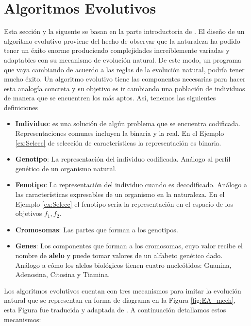 \section{Algoritmos Evolutivos} \label{sec:AE}

Esta sección y la siguente se basan en la parte introductoria de \cite{EAforMOEAs}. El diseño de un algoritmo evolutivo proviene del hecho de observar  que la naturaleza ha podido tener un éxito enorme produciendo complejidades increíblemente variadas y adaptables con su mecanismo de evolución natural. De este modo, un programa que vaya cambiando de acuerdo a las reglas de la evolución natural, podría tener mucho éxito. Un algoritmo evolutivo tiene las componentes necesarias para hacer esta analogía concreta y su objetivo es ir cambiando una población de individuos de manera que se encuentren los más aptos. Así, tenemos las siguientes definiciones

\begin{itemize}
    \item \textbf{Individuo}: es una solución de algún problema que se encuentra codificada. Representaciones comunes incluyen la binaria y la real. En el Ejemplo \ref{ex:Selecc} de selección de características  la representación es binaria.
    \item \textbf{Genotipo}: La representación del individuo codificada. Análogo al perfil genético de un organismo natural. 
    \item \textbf{Fenotipo}: La representación del individuo cuando es decodificado. Análogo a las características expresables de un organismo en la naturaleza. En el Ejemplo \ref{ex:Selecc} el fenotipo sería la representación en el espacio de los objetivos $f_1, f_2$.
    \item \textbf{Cromosomas}: Las partes que forman a los genotipos.
    \item \textbf{Genes}: Los componentes que forman a los cromosomas, cuyo valor recibe el nombre de \textbf{alelo} y puede tomar valores de un alfabeto genético dado. Análogo a cómo los alelos biológicos tienen cuatro nucleótidos: Guanina, Adenosina, Citosina y Tiamina. 
\end{itemize}

Los algoritmos evolutivos cuentan con tres mecanismos para imitar la evolución natural que se representan en forma de diagrama en la Figura \ref{fig:EA_mech}, esta Figura fue traducida y adaptada de \cite{coelloEvolutionaryAlgorithmsSolving}. A continuación detallamos estos mecanismos: 

